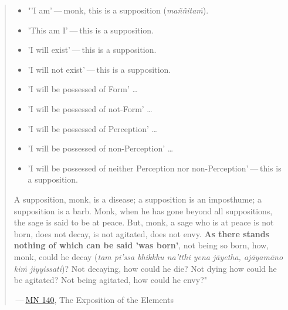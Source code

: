 \begin{quote}
\begin{itemize}
\item
  "'I am' --- monk, this is a supposition (\emph{maññitaṁ}).
\item
  'This am I' --- this is a supposition.
\item
  'I will exist' --- this is a supposition.
\item
  'I will not exist' --- this is a supposition.
\item
  'I will be possessed of Form' \ldots\hspace{0pt}
\item
  'I will be possessed of not-Form' \ldots\hspace{0pt}
\item
  'I will be possessed of Perception' \ldots\hspace{0pt}
\item
  'I will be possessed of non-Perception' \ldots\hspace{0pt}
\item
  'I will be possessed of neither Perception nor non-Perception' --- this is a supposition.
\end{itemize}

A supposition, monk, is a disease; a supposition is an imposthume; a supposition is a barb. Monk, when he has gone beyond all suppositions, the sage is said to be at peace. But, monk, a sage who is at peace is not born, does not decay, is not agitated, does not envy. \textbf{As there stands nothing of which can be said 'was born'}, not being so born, how, monk, could he decay (\emph{tam pi'ssa bhikkhu na'tthi yena jāyetha, ajāyamāno kiṁ jiyyissati})? Not decaying, how could he die? Not dying how could he be agitated? Not being agitated, how could he envy?"

 --- \href{https://suttacentral.net/mn140/en/bodhi}{MN 140}, The Exposition of the Elements
\end{quote}

